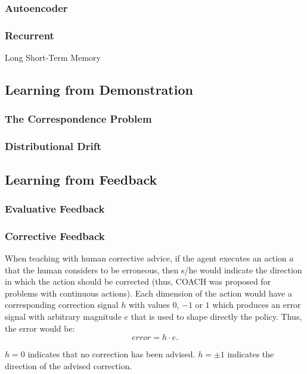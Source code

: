 \subsubsection{Autoencoder}
\subsubsection{Recurrent}
Long Short-Term Memory

\subsection{Learning from Demonstration}
\subsubsection{The Correspondence Problem}
\subsubsection{Distributional Drift}
\subsection{Learning from Feedback}
\subsubsection{Evaluative Feedback}
\subsubsection{Corrective Feedback}
When teaching with human corrective advice, if the agent executes an action $a$ that the human considers to be erroneous, then s/he would indicate the direction in which the action should be corrected (thus, COACH was proposed for problems with continuous actions). Each dimension of the action would have a corresponding correction signal $h$ with values $0$, $-1$ or $1$ which produces an error signal with arbitrary magnitude $e$ that is used to shape directly the policy. Thus, the error would be: 
\begin{equation}\label{eq:error}
    error=h \cdot e.
\end{equation}

$h=0$ indicates that no correction has been advised. $h=\pm 1$ indicates the direction of the advised correction.

